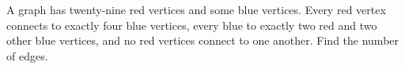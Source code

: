 A graph has twenty-nine red vertices and some blue vertices. Every red vertex connects to exactly four blue vertices, every blue to exactly two red and two other blue vertices, and no red vertices connect to one another. Find the number of edges.
